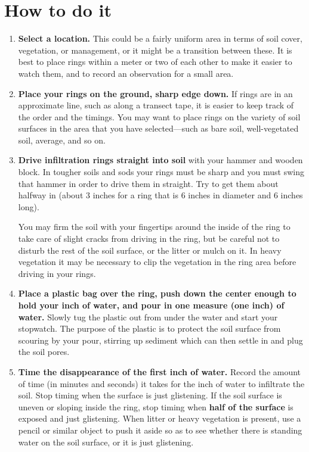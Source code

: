 \documentclass[11pt,letterpaper,twoside,onecolumn]{memoir}
\begin{document}
\section*{How to do it}
\begin{enumerate}
\item \textbf{Select a location.} This could be a fairly uniform area in terms of soil cover, vegetation, or management, or it might be a transition between these. It is best to place rings within a meter or two of each other to make it easier to watch them, and to record an observation for a small area. 

\item \textbf{Place your rings on the ground, sharp edge down.} If rings are in an approximate line, such as along a transect tape, it is easier to keep track of the order and the timings. You may want to place rings on the variety of soil surfaces in the area that you have selected---such as bare soil, well-vegetated soil, average, and so on.
\item{\textbf{Drive infiltration rings straight into soil} with your hammer and wooden block. In tougher soils and sods your rings must be sharp and you must swing that hammer in order to drive them in straight. Try to get them about halfway in (about 3 inches for a ring that is 6 inches in diameter and 6 inches long).

You may firm the soil with your fingertips around the inside of the ring to take care of slight cracks from driving in the ring, but be careful not to disturb the rest of the soil surface, or the litter or mulch on it. In heavy vegetation it may be necessary to clip the vegetation in the ring area before driving in your rings.}

\item \textbf{Place a plastic bag over the ring, push down the center enough to hold your inch of water, and pour in one measure (one inch) of water.} Slowly tug the plastic out from under the water and start your stopwatch. The purpose of the plastic is to protect the soil surface from scouring by your pour, stirring up sediment which can then settle in and plug the soil pores. 
 
\item \textbf{Time the disappearance of the first inch of water.} Record the amount of time (in minutes and seconds) it takes for the inch of water to infiltrate the soil. Stop timing when the surface is just glistening. If the soil surface is uneven or sloping inside the ring, stop timing when \textbf{half of the surface} is exposed and just glistening. When litter or heavy vegetation is present, use a pencil or similar object to push it aside so as to see whether there is standing water on the soil surface, or it is just glistening. 


\end{enumerate}
\end{document}
